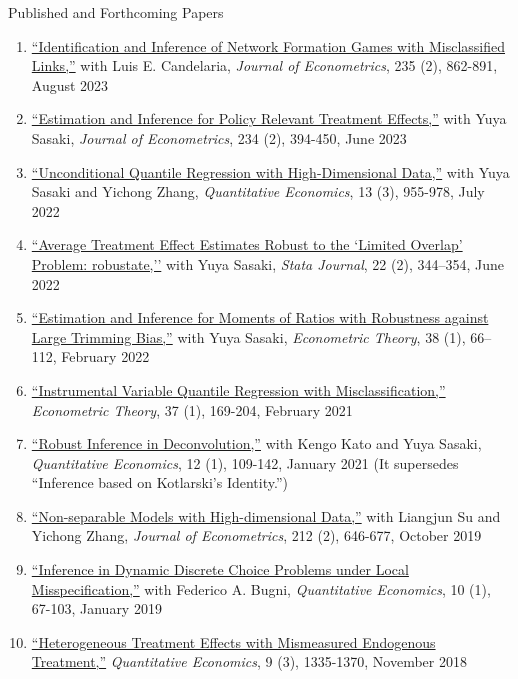 \documentclass{article}
\begin{document}
\bigskip\noindent  Published and Forthcoming Papers  
\begin{enumerate}
\item \href{https://doi.org/10.1016/j.jeconom.2022.07.007}{``Identification and Inference of Network Formation Games with Misclassified Links,''}  with Luis E. Candelaria,  \textit{Journal of Econometrics}, 
235 (2), 862-891, August 2023 
\item \href{https://doi.org/10.1016/j.jeconom.2021.03.015}{``Estimation and Inference for Policy Relevant Treatment Effects,''} with Yuya Sasaki, \textit{Journal of Econometrics}, 234 (2), 394-450, June 2023 
\item \href{https://www.econometricsociety.org/publications/quantitative-economics/2022/07/01/Unconditional-quantile-regression-with-highdimensional-data}{``Unconditional Quantile Regression with High-Dimensional Data,''} with Yuya Sasaki and Yichong Zhang, \textit{Quantitative Economics}, 13 (3), 955-978, July 2022
\item \href{https://doi.org/10.1177/1536867X221106402}{``Average Treatment Effect Estimates Robust to the `Limited Overlap’ Problem: robustate,''}  with Yuya Sasaki,  \textit{Stata Journal}, 22 (2), 344–354, June 2022
\item \href{https://doi.org/10.1017/S0266466621000025}{``Estimation and Inference for Moments of Ratios with Robustness against Large Trimming Bias,''}  with Yuya Sasaki,   \textit{Econometric Theory}, 38 (1), 66–112, February 2022
\item \href{https://doi.org/10.1017/S026646662000002X}{``Instrumental Variable Quantile Regression with Misclassification,''} \textit{Econometric Theory}, 37 (1), 169-204, February 2021 
\item \href{https://www.econometricsociety.org/publications/quantitative-economics/2021/01/01/Robust-inference-in-deconvolution}{``Robust Inference in Deconvolution,''}  with Kengo Kato and Yuya Sasaki, \textit{Quantitative Economics}, 12 (1), 109-142, January 2021 (It supersedes ``Inference based on Kotlarski's Identity.'')  
\item \href{https://doi.org/10.1016/j.jeconom.2019.06.004}{``Non-separable Models with High-dimensional Data,''} with Liangjun Su and Yichong Zhang, \textit{Journal of Econometrics}, 212 (2), 646-677, October 2019 
\item \href{https://onlinelibrary.wiley.com/doi/full/10.3982/QE917}{``Inference in Dynamic Discrete Choice Problems under Local Misspecification,''} with Federico A. Bugni, \textit{Quantitative Economics}, 10 (1), 67-103, January 2019
\item \href{https://onlinelibrary.wiley.com/doi/full/10.3982/qe886}{``Heterogeneous Treatment Effects with Mismeasured Endogenous Treatment,''} \textit{Quantitative Economics}, 9 (3), 1335-1370, November 2018
\end{enumerate}
\end{document}
